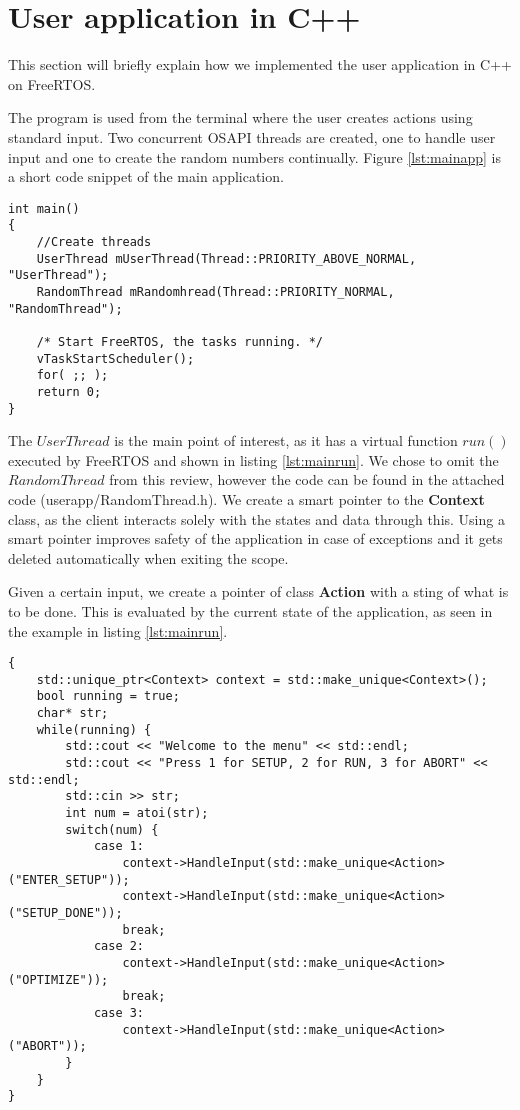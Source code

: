 \section{User application in C++}

This section will briefly explain how we implemented the user application in C++ on FreeRTOS. 

The program is used from the terminal where the user creates actions using standard input. Two concurrent OSAPI threads are created, one to handle user input and one to create the random numbers continually. Figure \ref{lst:mainapp} is a short code snippet of the main application.

\begin{lstlisting}[style=customc++,caption={Main application, where two threads are created and the scheduler started.},label={lst:mainapp}]
int main()
{
	//Create threads
	UserThread mUserThread(Thread::PRIORITY_ABOVE_NORMAL, "UserThread");
	RandomThread mRandomhread(Thread::PRIORITY_NORMAL, "RandomThread");

	/* Start FreeRTOS, the tasks running. */
	vTaskStartScheduler();
	for( ;; );
	return 0;
}
\end{lstlisting}

The $UserThread$ is the main point of interest, as it has a virtual function $run()$ executed by FreeRTOS and shown in listing \ref{lst:mainrun}. We chose to omit the $RandomThread$ from this review, however the code can be found in the attached code (userapp/RandomThread.h). We create a smart pointer to the \textbf{Context} class, as the client interacts solely with the states and data through this. Using a smart pointer improves safety of the application in case of exceptions and it gets deleted automatically when exiting the scope. 

Given a certain input, we create a pointer of class \textbf{Action} with a sting of what is to be done. This is evaluated by the current state of the application, as seen in the example in listing \ref{lst:mainrun}.

\begin{lstlisting}[style=customc++,caption={Main application, where two threads are created with a scheduler.},label={lst:mainrun}]
{
	std::unique_ptr<Context> context = std::make_unique<Context>();
	bool running = true;
	char* str;
	while(running) {
		std::cout << "Welcome to the menu" << std::endl;
		std::cout << "Press 1 for SETUP, 2 for RUN, 3 for ABORT" << std::endl;
		std::cin >> str;
		int num = atoi(str);
		switch(num) {
			case 1:
				context->HandleInput(std::make_unique<Action>("ENTER_SETUP"));
				context->HandleInput(std::make_unique<Action>("SETUP_DONE"));
				break;
			case 2:
				context->HandleInput(std::make_unique<Action>("OPTIMIZE"));
				break;
			case 3:
				context->HandleInput(std::make_unique<Action>("ABORT"));
		}
	}
}
\end{lstlisting}

